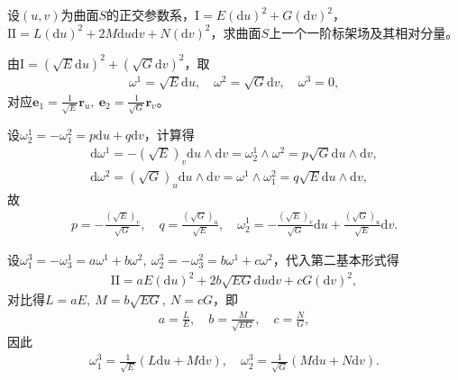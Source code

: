 \documentclass[../../main.tex]{subfiles}%
\begin{document}
\begin{example}
设$(u,v)$为曲面$S$的正交参数系，$\mathrm{I}=E(\mathrm{d}u)^2+G(\mathrm{d}v)^2$，$\mathrm{II}=L(\mathrm{d}u)^2+2M\mathrm{d}u\mathrm{d}v+N(\mathrm{d}v)^2$，求曲面$S$上一个一阶标架场及其相对分量。
\end{example}
\begin{solution}
由$\mathrm{I}=(\sqrt{E}\mathrm{d}u)^2+(\sqrt{G}\mathrm{d}v)^2$，取
\begin{align*}
\omega^1=\sqrt{E}\mathrm{d}u,\quad \omega^2=\sqrt{G}\mathrm{d}v,\quad \omega^3=0,
\end{align*}
对应$\boldsymbol{e}_1=\frac{1}{\sqrt{E}}\boldsymbol{r}_u,\ \boldsymbol{e}_2=\frac{1}{\sqrt{G}}\boldsymbol{r}_v$。

设$\omega_2^1=-\omega_1^2=p\mathrm{d}u+q\mathrm{d}v$，计算得
\begin{align*}
\mathrm{d}\omega^1=-(\sqrt{E})_v\mathrm{d}u\wedge\mathrm{d}v=\omega_2^1\wedge\omega^2=p\sqrt{G}\mathrm{d}u\wedge\mathrm{d}v,\\
\mathrm{d}\omega^2=(\sqrt{G})_u\mathrm{d}u\wedge\mathrm{d}v=\omega^1\wedge\omega_1^2=q\sqrt{E}\mathrm{d}u\wedge\mathrm{d}v,
\end{align*}
故
\begin{align*}
p=-\frac{(\sqrt{E})_v}{\sqrt{G}},\quad q=\frac{(\sqrt{G})_u}{\sqrt{E}},\quad \omega_2^1=-\frac{(\sqrt{E})_v}{\sqrt{G}}\mathrm{d}u+\frac{(\sqrt{G})_u}{\sqrt{E}}\mathrm{d}v.
\end{align*}

设$\omega_1^3=-\omega_3^1=a\omega^1+b\omega^2,\ \omega_2^3=-\omega_3^2=b\omega^1+c\omega^2$，代入第二基本形式得
\begin{align*}
\mathrm{II}=aE(\mathrm{d}u)^2+2b\sqrt{EG}\mathrm{d}u\mathrm{d}v+cG(\mathrm{d}v)^2,
\end{align*}
对比得$L=aE,\ M=b\sqrt{EG},\ N=cG$，即
\begin{align*}
a=\frac{L}{E},\quad b=\frac{M}{\sqrt{EG}},\quad c=\frac{N}{G},
\end{align*}
因此
\begin{align*}
\omega_1^3=\frac{1}{\sqrt{E}}(L\mathrm{d}u+M\mathrm{d}v),\quad \omega_2^3=\frac{1}{\sqrt{G}}(M\mathrm{d}u+N\mathrm{d}v).
\end{align*}

\end{solution}
\end{document}
